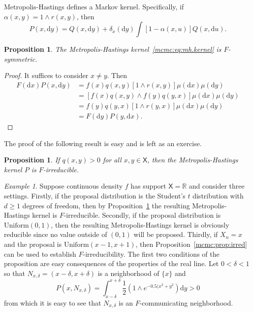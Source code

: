 \documentclass[12pt]{article}
\theoremstyle{plain}
\newtheorem{prop}[thm]{Proposition}
\theoremstyle{definition}
\theoremstyle{remark}
\newtheorem{example}{Example}[section]
\newcommand{\df}{\mathrm{d}}
\newcommand{\X}{\mathsf{X}}
\newcommand{\real}{\mathbb{R}}
\begin{document}
Metropolis-Hastings defines a Markov kernel.  Specifically, if
$\alpha(x, y) = 1 \wedge r(x,y)$, then 
\begin{equation}
  \label{mcmc:eq:mh.kernel}
  P(x, \df y) = Q(x, \df y) + \delta_x(\df y) \int \left[ 1 -
    \alpha(x, u) \right] Q(x, \df u) .
\end{equation}

\begin{prop}
  \label{mcmc:prop:mh.symmetric}
  The Metropolis-Hastings kernel~\eqref{mcmc:eq:mh.kernel} is $F$-symmetric.
\end{prop}

\begin{proof}
  It suffices to consider $x \neq y$.  Then
  \begin{align*}
    F(\df x) P(x, \df y) & = f(x) q(x, y) \left[ 1 \wedge r(x, y)
                           \right] \mu(\df x) \mu(\df y) \\
    &  = \left[ f(x) q(x, y) \wedge f(y) q(y, x) \right] \mu(\df x)
      \mu(\df y) \\
    & = f(y) q(y, x) \left[ 1 \wedge r(y,x) \right] \mu(\df x) \mu(\df
      y) \\
    & = F(\df y) P(y, \df x) .
    \end{align*}
  \end{proof}

  The proof of the following result is easy and is left as
  an exercise.

\begin{prop}
 \label{mcmc:prop:mh.irreducible}
If $q(x, y) > 0$ for all $x,y \in \X$, then the Metropolis-Hastings
kernel $P$ is $F$-irreducible.
\end{prop}

\begin{example}
  Suppose continuous density $f$ has support $\X = \real$ and consider three settings.  Firstly, if the proposal
  distribution is the Student's $t$ distribution with $d \ge 1$
  degrees of freedom, then by
  Proposition~\ref{mcmc:prop:mh.irreducible} the resulting
  Metropolis-Hastings kernel is $F$-irreducible.    Secondly, if the proposal distribution is $\text{Uniform}(0,1)$, then the
  resulting Metropolis-Hastings kernel is obviously reducible since no
  value outside of $(0,1)$ will be proposed. Thirdly,  if $X_n = x$ and the proposal is $\text{Uniform}(x -1,
  x+1)$, then Proposition~\ref{mcmc:prop:irred} can be used to
  establish $F$-irreducibility.  The first two conditions of the
  proposition are easy consequences of the properties of the real
  line.  Let $0 < \delta < 1$ so that $N_{x, \delta} = (x - \delta, x + \delta)$ is a
  neighborhood of $\{ x\}$ and
  \[
P(x, N_{x, \delta}) = \int_{x-\delta}^{x+\delta} \frac{1}{2} \left( 1 \wedge
e^{-0.5(x^2 + y^2} \right) \df y > 0
\]
from which it is easy to see that $N_{x,\delta}$ is an $F$-communicating neighborhood.
\end{example}
\end{document}

